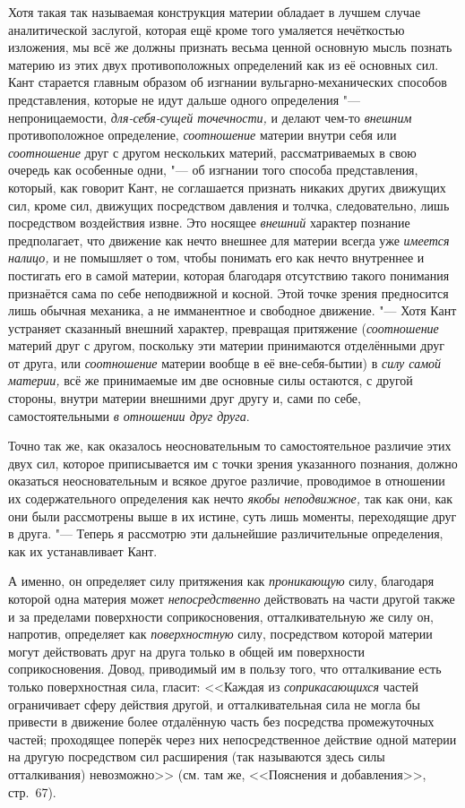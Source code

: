 Хотя такая так называемая конструкция материи обладает в лучшем случае
аналитической заслугой, которая ещё кроме того умаляется нечёткостью
изложения, мы всё же должны признать весьма ценной основную мысль познать
материю из этих двух противоположных определений как из её основных сил.
Кант старается главным образом об изгнании вульгарно-механических способов
представления, которые не идут дальше одного определения "---
непроницаемости, {\em для-себя-сущей точечности,} и делают чем-то
{\em внешним} противоположное определение,
{\em соотношение} материи внутри себя или
{\em соотношение} друг с другом нескольких материй,
рассматриваемых в свою очередь как особенные одни, "--- об изгнании того
способа представления, который, как говорит Кант, не соглашается признать
никаких других движущих сил, кроме сил, движущих посредством давления и
толчка, следовательно, лишь посредством воздействия извне. Это носящее
{\em внешний} характер познание предполагает, что
движение как нечто внешнее для материи всегда уже
{\em имеется налицо,} и не помышляет о том, чтобы
понимать его как нечто внутреннее и постигать его в самой материи, которая
благодаря отсутствию такого понимания признаётся сама по себе неподвижной и
косной. Этой точке зрения предносится лишь обычная механика, а не
имманентное и свободное движение. "--- Хотя Кант устраняет сказанный внешний
характер, превращая притяжение ({\em соотношение}
материй друг с другом, поскольку эти материи принимаются отделёнными друг
от друга, или {\em соотношение} материи вообще в её
вне-себя-бытии) в {\em силу самой материи,} всё же
принимаемые им две основные силы остаются, с другой стороны, внутри материи
внешними друг другу и, сами по себе, самостоятельными
{\em в отношении друг друга}.

Точно так же, как оказалось неосновательным то самостоятельное различие этих
двух сил, которое приписывается им с точки зрения указанного познания,
должно оказаться неосновательным и всякое другое различие, проводимое в
отношении их содержательного определения как нечто
{\em якобы неподвижное,} так как они, как они были
рассмотрены выше в их истине, суть лишь моменты, переходящие друг в друга.
"--- Теперь я рассмотрю эти дальнейшие различительные определения, как их
устанавливает Кант.

А именно, он определяет силу притяжения как
{\em проникающую} силу, благодаря которой одна материя
может {\em непосредственно} действовать на части другой
также и за пределами поверхности соприкосновения, отталкивательную же силу
он, напротив, определяет как {\em поверхностную} силу,
посредством которой материи могут действовать друг на друга только в общей
им поверхности соприкосновения. Довод, приводимый им в пользу того, что
отталкивание есть только поверхностная сила, гласит:
<<Каждая из {\em соприкасающихся} частей ограничивает
сферу действия другой, и отталкивательная сила не могла бы привести в
движение более отдалённую часть без посредства промежуточных частей;
проходящее поперёк через них непосредственное действие одной материи на
другую посредством сил расширения (так называются здесь силы отталкивания)
невозможно>> (см. там же, <<Пояснения и добавления>>, стр.~67).

